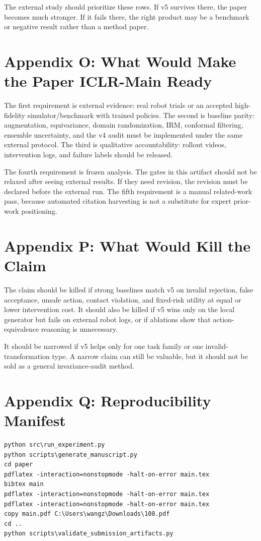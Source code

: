 \documentclass{article}
\begin{document}
The external study should prioritize these rows. If v5 survives there, the paper becomes much stronger. If it fails there, the right product may be a benchmark or negative result rather than a method paper.


\section{Appendix O: What Would Make the Paper ICLR-Main Ready}
The first requirement is external evidence: real robot trials or an accepted high-fidelity simulator/benchmark with trained policies. The second is baseline parity: augmentation, equivariance, domain randomization, IRM, conformal filtering, ensemble uncertainty, and the v4 audit must be implemented under the same external protocol. The third is qualitative accountability: rollout videos, intervention logs, and failure labels should be released.

The fourth requirement is frozen analysis. The gates in this artifact should not be relaxed after seeing external results. If they need revision, the revision must be declared before the external run. The fifth requirement is a manual related-work pass, because automated citation harvesting is not a substitute for expert prior-work positioning.


\section{Appendix P: What Would Kill the Claim}
The claim should be killed if strong baselines match v5 on invalid rejection, false acceptance, unsafe action, contact violation, and fixed-risk utility at equal or lower intervention cost. It should also be killed if v5 wins only on the local generator but fails on external robot logs, or if ablations show that action-equivalence reasoning is unnecessary.

It should be narrowed if v5 helps only for one task family or one invalid-transformation type. A narrow claim can still be valuable, but it should not be sold as a general invariance-audit method.


\section{Appendix Q: Reproducibility Manifest}
\begin{verbatim}
python src\run_experiment.py
python scripts\generate_manuscript.py
cd paper
pdflatex -interaction=nonstopmode -halt-on-error main.tex
bibtex main
pdflatex -interaction=nonstopmode -halt-on-error main.tex
pdflatex -interaction=nonstopmode -halt-on-error main.tex
copy main.pdf C:\Users\wangz\Downloads\108.pdf
cd ..
python scripts\validate_submission_artifacts.py
\end{verbatim}
\end{document}
